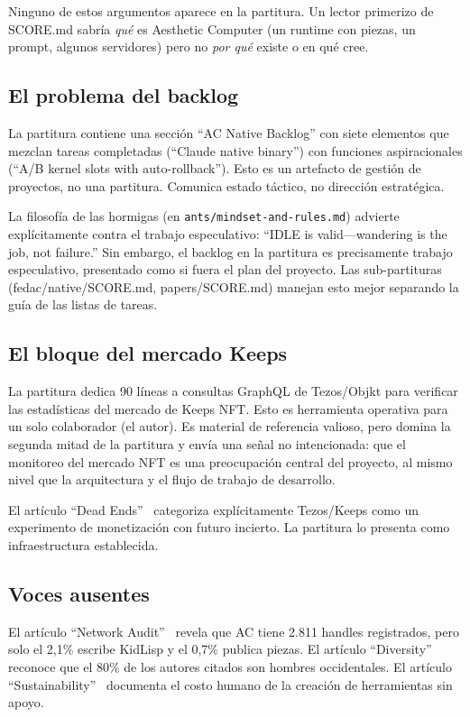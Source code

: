 \documentclass[10pt,letterpaper,twocolumn]{article}
\begin{document}
Ninguno de estos argumentos aparece en la partitura. Un lector primerizo de SCORE.md sabr\'ia \emph{qu\'e} es Aesthetic Computer (un runtime con piezas, un prompt, algunos servidores) pero no \emph{por qu\'e} existe o en qu\'e cree.

\subsection{El problema del backlog}

La partitura contiene una secci\'on ``AC Native Backlog'' con siete elementos que mezclan tareas completadas (``Claude native binary'') con funciones aspiracionales (``A/B kernel slots with auto-rollback''). Esto es un artefacto de gesti\'on de proyectos, no una partitura. Comunica estado t\'actico, no direcci\'on estrat\'egica.

La filosof\'ia de las hormigas (en \texttt{ants/mindset-and-rules.md}) advierte expl\'icitamente contra el trabajo especulativo: ``IDLE is valid---wandering is the job, not failure.'' Sin embargo, el backlog en la partitura es precisamente trabajo especulativo, presentado como si fuera el plan del proyecto. Las sub-partituras (fedac/native/SCORE.md, papers/SCORE.md) manejan esto mejor separando la gu\'ia de las listas de tareas.

\subsection{El bloque del mercado Keeps}

La partitura dedica 90 l\'ineas a consultas GraphQL de Tezos/Objkt para verificar las estad\'isticas del mercado de Keeps NFT. Esto es herramienta operativa para un solo colaborador (el autor). Es material de referencia valioso, pero domina la segunda mitad de la partitura y env\'ia una se\~nal no intencionada: que el monitoreo del mercado NFT es una preocupaci\'on central del proyecto, al mismo nivel que la arquitectura y el flujo de trabajo de desarrollo.

El art\'iculo ``Dead Ends''~\citep{scudder2026deadends} categoriza expl\'icitamente Tezos/Keeps como un experimento de monetizaci\'on con futuro incierto. La partitura lo presenta como infraestructura establecida.

\subsection{Voces ausentes}

El art\'iculo ``Network Audit''~\citep{scudder2026audit} revela que AC tiene 2.811 handles registrados, pero solo el 2,1\% escribe KidLisp y el 0,7\% publica piezas. El art\'iculo ``Diversity''~\citep{scudder2026diversity} reconoce que el 80\% de los autores citados son hombres occidentales. El art\'iculo ``Sustainability''~\citep{scudder2026sustainability} documenta el costo humano de la creaci\'on de herramientas sin apoyo.
\end{document}
